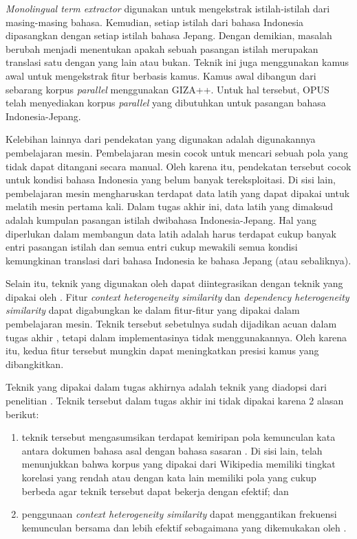 \documentclass[../main/main.tex]{subfiles}
\begin{document}
\textit{Monolingual term extractor} digunakan untuk mengekstrak istilah-istilah dari masing-masing bahasa. Kemudian, setiap istilah dari bahasa Indonesia dipasangkan dengan setiap istilah bahasa Jepang. Dengan demikian, masalah berubah menjadi menentukan apakah sebuah pasangan istilah merupakan translasi satu dengan yang lain atau bukan. Teknik ini juga menggunakan kamus awal untuk mengekstrak fitur berbasis kamus. Kamus awal dibangun dari sebarang korpus \textit{parallel} menggunakan GIZA++. Untuk hal tersebut, OPUS telah menyediakan korpus \textit{parallel} yang dibutuhkan untuk pasangan bahasa Indonesia-Jepang.

Kelebihan lainnya dari pendekatan yang digunakan \textcite{aker} adalah digunakannya pembelajaran mesin. Pembelajaran mesin cocok untuk mencari sebuah pola yang tidak dapat ditangani secara manual. Oleh karena itu, pendekatan tersebut cocok untuk kondisi bahasa Indonesia yang belum banyak tereksploitasi. Di sisi lain, pembelajaran mesin mengharuskan terdapat data latih yang dapat dipakai untuk melatih mesin pertama kali. Dalam tugas akhir ini, data latih yang dimaksud adalah kumpulan pasangan istilah dwibahasa Indonesia-Jepang. Hal yang diperlukan dalam membangun data latih adalah harus terdapat cukup banyak entri pasangan istilah dan semua entri cukup mewakili semua kondisi kemungkinan translasi dari bahasa Indonesia ke bahasa Jepang (atau sebaliknya).

Selain itu, teknik yang digunakan oleh \textcite{aker} dapat diintegrasikan dengan teknik yang dipakai oleh \textcite{yu}. Fitur \textit{context heterogeneity similarity} dan \textit{dependency heterogeneity similarity} dapat digabungkan ke dalam fitur-fitur yang dipakai dalam pembelajaran mesin. Teknik tersebut sebetulnya sudah dijadikan acuan dalam tugas akhir \textcite{limanthie}, tetapi dalam implementasinya \textcite{limanthie} tidak menggunakannya. Oleh karena itu, kedua fitur tersebut mungkin dapat meningkatkan presisi kamus yang dibangkitkan.

Teknik yang dipakai \textcite{limanthie} dalam tugas akhirnya adalah teknik yang diadopsi dari penelitian \textcite{rapp}. Teknik tersebut dalam tugas akhir ini tidak dipakai karena 2 alasan berikut:
\begin{enumerate}
\item teknik tersebut mengasumsikan terdapat kemiripan pola kemunculan kata antara dokumen bahasa asal dengan bahasa sasaran \parencite{rapp}. Di sisi lain, \textcite{limanthie} telah menunjukkan bahwa korpus yang dipakai dari Wikipedia memiliki tingkat korelasi yang rendah atau dengan kata lain memiliki pola yang cukup berbeda agar teknik tersebut dapat bekerja dengan efektif; dan
\item penggunaan \textit{context heterogeneity similarity} dapat menggantikan frekuensi kemunculan bersama dan lebih efektif sebagaimana yang dikemukakan oleh \textcite{fung}.
\end{enumerate}
\end{document}
